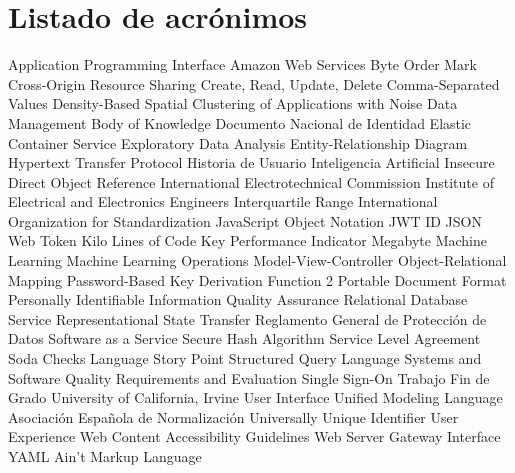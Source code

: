 \chapter{Listado de acrónimos}

\begin{acronym}[XXXXXXXX]
       {Application Programming Interface}
       {Amazon Web Services}
       {Byte Order Mark}
      {Cross-Origin Resource Sharing}
      {Create, Read, Update, Delete}
       {Comma-Separated Values}
    {Density-Based Spatial Clustering of Applications with Noise}
     {Data Management Body of Knowledge}
       {Documento Nacional de Identidad}
       {Elastic Container Service}
       {Exploratory Data Analysis}
       {Entity-Relationship Diagram}
      {Hypertext Transfer Protocol}
        {Historia de Usuario}
        {Inteligencia Artificial}
      {Insecure Direct Object Reference}
       {International Electrotechnical Commission}
      {Institute of Electrical and Electronics Engineers}
       {Interquartile Range}
       {International Organization for Standardization}
      {JavaScript Object Notation}
       {JWT ID}
       {JSON Web Token}
      {Kilo Lines of Code}
       {Key Performance Indicator}
        {Megabyte}
        {Machine Learning}
     {Machine Learning Operations}
       {Model-View-Controller}
       {Object-Relational Mapping}
    {Password-Based Key Derivation Function 2}
       {Portable Document Format}
       {Personally Identifiable Information}
        {Quality Assurance}
       {Relational Database Service}
      {Representational State Transfer}
      {Reglamento General de Protección de Datos}
      {Software as a Service}
       {Secure Hash Algorithm}
       {Service Level Agreement}
    {Soda Checks Language}
        {Story Point}
       {Structured Query Language}
    {Systems and Software Quality Requirements and Evaluation}
       {Single Sign-On}
       {Trabajo Fin de Grado}
       {University of California, Irvine}
        {User Interface}
       {Unified Modeling Language}
       {Asociación Española de Normalización}
      {Universally Unique Identifier}
        {User Experience}
      {Web Content Accessibility Guidelines}
      {Web Server Gateway Interface}
      {YAML Ain't Markup Language}
\end{acronym}




